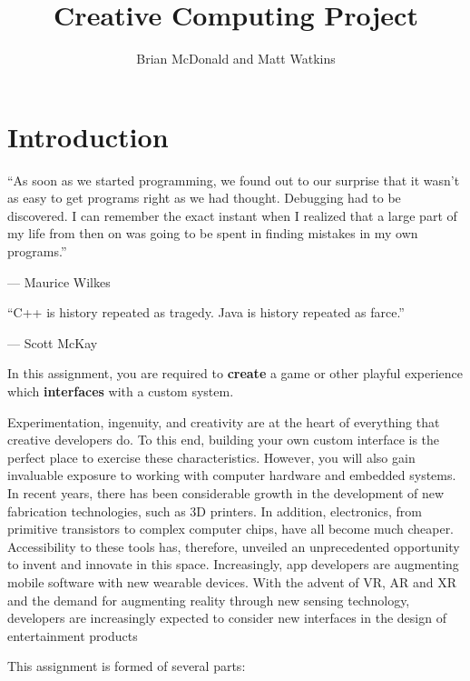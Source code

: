 \documentclass{../../fal_assignment}
\title{Creative Computing Project}
\author{Brian McDonald and Matt Watkins}
\begin{document}
	
	\maketitle
	
	\section*{Introduction}
	
	\begin{marginquote}
		``As soon as we started programming, we found out to our surprise that it 
		wasn't as easy to get programs right as we had thought. 
		Debugging had to be discovered. I can remember the exact instant when 
		I realized that a large part of my life from then on was going to be spent 
		in finding mistakes in my own programs.''
		\par --- Maurice Wilkes
		\marginquoterule
		\par ``C++ is history repeated as tragedy. Java is history repeated as farce.''
		\par --- Scott McKay
	\end{marginquote}
	
	In this assignment, you are required to \textbf{create} a game or other playful experience 
	which \textbf{interfaces} with a custom system.
	
	Experimentation, ingenuity, and creativity are at the heart of everything that 
	creative developers do. To this end, building your own custom interface is the perfect 
	place to exercise these characteristics. However, you will also gain invaluable exposure to 
	working with computer hardware and embedded systems. In recent years, there has been considerable growth in the 
	development of new fabrication technologies, such as 3D printers. In addition, electronics, 
	from primitive transistors to complex computer chips, have all become much cheaper. Accessibility 
	to these tools has, therefore, unveiled an unprecedented opportunity to invent and innovate 
	in this space. Increasingly, app developers are augmenting mobile software with new wearable 
	devices. With the advent of VR, AR and XR and the demand for augmenting reality through new sensing technology, developers are increasingly expected to consider new interfaces in the design of entertainment products
	
	This assignment is formed of several parts:
	
\end{document}
